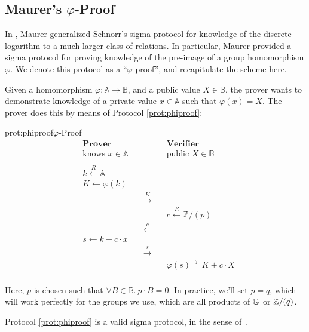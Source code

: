 \subsection{Maurer's \texorpdfstring{$\varphi$}{varphi}-Proof}
\label{sec:maurer}

In \cite{maurer_unifying_2009}, Maurer generalized Schnorr's sigma 
protocol for knowledge of the discrete logarithm \cite{schnorr_efficient_1990} to a much larger class
of relations. In particular, Maurer provided a sigma protocol for
proving knowledge of the pre-image of a group homomorphism $\varphi$.
We denote this protocol as a ``$\varphi$-proof'', and recapitulate the scheme
here.

Given a homomorphism $\varphi : \mathbb{A} \to \mathbb{B}$, and a public value
$X \in \mathbb{B}$, the prover wants to demonstrate knowledge of a private
value $x \in \mathbb{A}$ such that $\varphi(x) = X$. The prover
does this by means of Protocol \ref{prot:phiproof}:

\begin{aprotocol}{prot:phiproof}{$\varphi$-Proof}
\[
\begin{aligned}
    &\textbf{Prover}&&\textbf{Verifier}\\
    &\text{knows } x \in \mathbb{A}&&\text{public } X \in \mathbb{B}\\
    \\
    &k \xleftarrow{R} \mathbb{A}&\\
    &K \gets \varphi(k)&\\
    &&\quad\overset{K}{\longrightarrow}\quad\\
    &&&c \xleftarrow{R} \mathbb{Z}/(p)\\
    &&\quad\overset{c}{\longleftarrow}\quad\\
    &s \gets k + c \cdot x\\
    &&\quad\overset{s}{\longrightarrow}\quad\\
    &&& \varphi(s) \overset{?}{=} K + c \cdot X\\
\end{aligned}
\]
\end{aprotocol}

Here, $p$ is chosen such that $\forall B \in \mathbb{B}.\ p \cdot B = 0$.
In practice, we'll set $p = q$, which will work perfectly for the groups
we use, which are all products of $\mathbb{G}$ or $\mathbb{Z}/(q)$.

\begin{claim}
    Protocol \ref{prot:phiproof} is a valid sigma protocol,
    in the sense of~\cite{damgard_sigma-protocols_2002}.
\end{claim}

